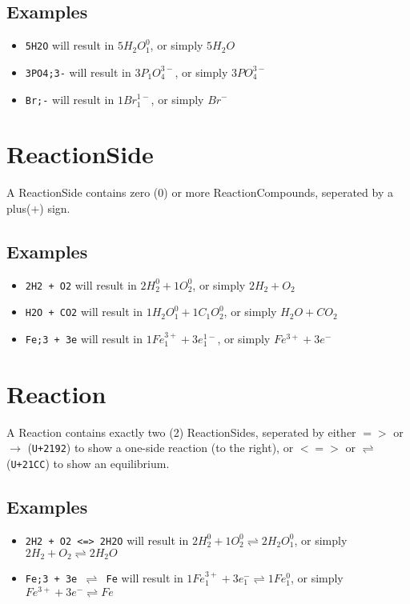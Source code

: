 \documentclass[11pt]{article}
\def\code#1{\texttt{#1}}
\def\equi{\rightleftharpoons}
\begin{document}
\subsection{Examples}
\begin{itemize}
  \item{\code{5H2O} will result in $5H_2O_1^0$, or simply $5H_2O$}
  \item{\code{3PO4;3-} will result in $3P_1O_4^{3-}$, or simply $3PO_4^{3-}$}
  \item{\code{Br;-} will result in $1Br_1^{1-}$, or simply $Br^-$}
\end{itemize}

\section{ReactionSide}
A ReactionSide contains zero (0) or more ReactionCompounds, seperated by a plus(+) sign.

\subsection{Examples}
\begin{itemize}
  \item{\code{2H2 + O2} will result in $2H_2^0 + 1O_2^0$, or simply $2H_2 + O_2$}
  \item{\code{H2O + CO2} will result in $1H_2O_1^0 + 1C_1O_2^0$, or simply $H_2O + CO_2$}
  \item{\code{Fe;3 + 3e} will result in $1Fe_1^{3+} + 3e_1^{1-}$, or simply $Fe^{3+} + 3e^-$}
\end{itemize}


\section{Reaction}
A Reaction contains exactly two (2) ReactionSides, seperated by either $=>$ or $\rightarrow$ (\code{U+2192}) to show a one-side reaction (to the right), or $<=>$ or $\equi$ (\code{U+21CC}) to show an equilibrium.

\newpage

\subsection{Examples}
\begin{itemize}
  \item{\code{2H2 + O2 <=> 2H2O} will result in $2H_2^0 + 1O_2^0 \equi 2H_2O_1^0$, or simply $2H_2 + O_2 \equi 2H_2O$}
  \item{\code{Fe;3 + 3e $\equi$ Fe} will result in $1Fe_1^{3+} + 3e_1^- \equi 1Fe_1^0$, or simply $Fe^{3+} + 3e^- \equi Fe$}
\end{itemize}
\end{document}
